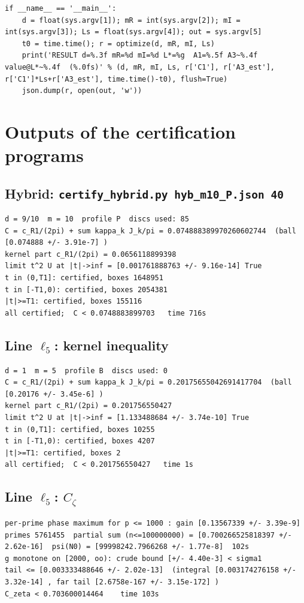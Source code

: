 \documentclass[11pt,reqno]{amsart}
\numberwithin{equation}{section}
\theoremstyle{definition}
\theoremstyle{remark}
\begin{document}
\begin{lstlisting}
if __name__ == '__main__':
    d = float(sys.argv[1]); mR = int(sys.argv[2]); mI = int(sys.argv[3]); Ls = float(sys.argv[4]); out = sys.argv[5]
    t0 = time.time(); r = optimize(d, mR, mI, Ls)
    print('RESULT d=%.3f mR=%d mI=%d L*=%g  A1=%.5f A3~%.4f  value@L*~%.4f  (%.0fs)' % (d, mR, mI, Ls, r['C1'], r['A3_est'], r['C1']*Ls+r['A3_est'], time.time()-t0), flush=True)
    json.dump(r, open(out, 'w'))
\end{lstlisting}
\section{Outputs of the certification programs}\label{app:cert}
\subsection*{Hybrid: \texttt{certify\_hybrid.py hyb\_m10\_P.json 40}}
\label{app:out_hybrid}
\begin{lstlisting}
d = 9/10  m = 10  profile P  discs used: 85
C = c_R1/(2pi) + sum kappa_k J_k/pi = 0.074888389970260602744  (ball [0.074888 +/- 3.91e-7] )
kernel part c_R1/(2pi) = 0.0656118899398
limit t^2 U at |t|->inf = [0.001761888763 +/- 9.16e-14] True
t in (0,T1]: certified, boxes 1648951
t in [-T1,0): certified, boxes 2054381
|t|>=T1: certified, boxes 155116
all certified;  C < 0.0748883899703   time 716s
\end{lstlisting}
\subsection*{Line $\ell_{5}$: kernel inequality}
\begin{lstlisting}
d = 1  m = 5  profile B  discs used: 0
C = c_R1/(2pi) + sum kappa_k J_k/pi = 0.20175655042691417704  (ball [0.20176 +/- 3.45e-6] )
kernel part c_R1/(2pi) = 0.201756550427
limit t^2 U at |t|->inf = [1.133488684 +/- 3.74e-10] True
t in (0,T1]: certified, boxes 10255
t in [-T1,0): certified, boxes 4207
|t|>=T1: certified, boxes 2
all certified;  C < 0.201756550427   time 1s
\end{lstlisting}
\subsection*{Line $\ell_{5}$: $C_\zeta$}
\begin{lstlisting}
per-prime phase maximum for p <= 1000 : gain [0.13567339 +/- 3.39e-9]
primes 5761455  partial sum (n<=100000000) = [0.700266525818397 +/- 2.62e-16]  psi(N0) = [99998242.7966268 +/- 1.77e-8]  102s
g monotone on [2000, oo): crude bound [+/- 4.40e-3] < sigma1
tail <= [0.003333488646 +/- 2.02e-13]  (integral [0.003174276158 +/- 3.32e-14] , far tail [2.6758e-167 +/- 3.15e-172] )
C_zeta < 0.703600014464    time 103s
\end{lstlisting}
\end{document}
